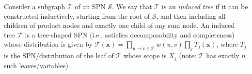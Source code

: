 \documentclass[accepted]{tpm2023} %
\DeclareMathOperator*{\ch}{ch}
\DeclareMathOperator*{\scope}{sc}
\begin{document}







Consider a subgraph $\mathcal{T}$ of an SPN $\mathcal{S}$. We say that $\mathcal{T}$ is an \emph{induced tree} if it can be constructed inductively, starting from the root of $\mathcal{S}$, and then including all children of product nodes and exactly one child of any sum node.
An induced tree $\mathcal{T}$ is a tree-shaped SPN (i.e., satisfies decomposability and completeness) whose distribution is given by
$\mathcal{T}(\mathbf{x}) = \prod_{u \rightarrow v \in \mathcal{T}} w(u, v) \prod_{j} T_j(\mathbf{x})$,
where $T_j$ is the SPN/distribution of the leaf of $\mathcal{T}$ whose scope is $X_j$ (note: $\mathcal{T}$ has exactly $n$ such leaves/variables).
\end{document}
